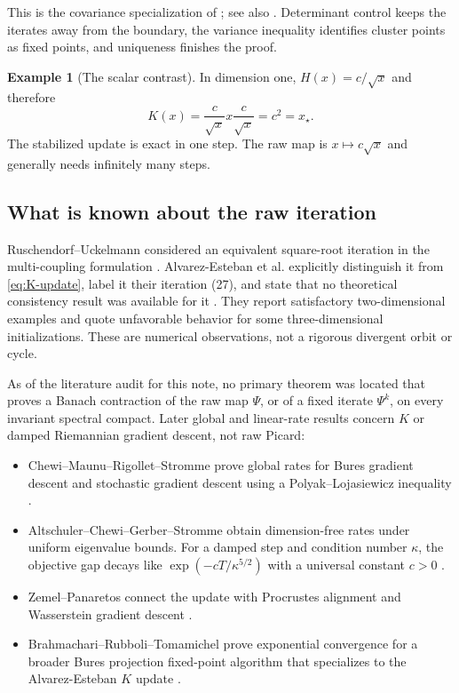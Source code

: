 \documentclass[11pt]{article}
\theoremstyle{definition}
\newtheorem{example}[theorem]{Example}
\begin{document}
This is the covariance specialization of
\cite[Theorem 4.2]{AlvarezEsteban2016}; see also
\cite{BhatiaJainLim2019}.  Determinant control keeps the iterates away from
the boundary, the variance inequality identifies cluster points as fixed
points, and uniqueness finishes the proof.

\begin{example}[The scalar contrast]
In dimension one, $H(x)=c/\sqrt{x}$ and therefore
\[
 K(x)=\frac{c}{\sqrt{x}}x\frac{c}{\sqrt{x}}=c^2=x_\star.
\]
The stabilized update is exact in one step.  The raw map is
$x\mapsto c\sqrt{x}$ and generally needs infinitely many steps.
\end{example}

\subsection{What is known about the raw iteration}

Ruschendorf--Uckelmann considered an equivalent square-root iteration in the
multi-coupling formulation \cite{RuschendorfUckelmann2002}.  Alvarez-Esteban
et al. explicitly distinguish it from \eqref{eq:K-update}, label it their
iteration (27), and state that no theoretical consistency result was available
for it \cite[Section 5]{AlvarezEsteban2016}.  They report satisfactory
two-dimensional examples and quote unfavorable behavior for some
three-dimensional initializations.  These are numerical observations, not a
rigorous divergent orbit or cycle.

As of the literature audit for this note, no primary theorem was located that
proves a Banach contraction of the raw map $\Psi$, or of a fixed iterate
$\Psi^k$, on every invariant spectral compact.  Later global and linear-rate
results concern $K$ or damped Riemannian gradient descent, not raw Picard:
\begin{itemize}
  \item Chewi--Maunu--Rigollet--Stromme prove global rates for Bures gradient
  descent and stochastic gradient descent using a Polyak--Lojasiewicz
  inequality \cite{ChewiEtAl2020}.
  \item Altschuler--Chewi--Gerber--Stromme obtain dimension-free rates under
  uniform eigenvalue bounds.  For a damped step and condition number
  $\kappa$, the objective gap decays like
  $\exp(-cT/\kappa^{5/2})$ with a universal constant $c>0$
  \cite{AltschulerEtAl2021}.
  \item Zemel--Panaretos connect the update with Procrustes alignment and
  Wasserstein gradient descent \cite{ZemelPanaretos2019}.
  \item Brahmachari--Rubboli--Tomamichel prove exponential convergence for a
  broader Bures projection fixed-point algorithm that specializes to the
  Alvarez-Esteban $K$ update \cite{BrahmachariEtAl2025}.
\end{itemize}
\end{document}
